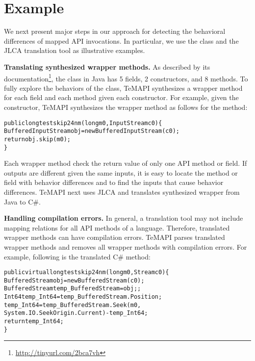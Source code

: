 \section{Example}
\label{sec:example}
We next present major steps in our approach for detecting the behavioral differences of mapped API invocations. In particular, we use the  class and the JLCA translation tool as illustrative examples.

\textbf{Translating synthesized wrapper methods.} As described by its documentation\footnote{\url{http://tinyurl.com/2bca7vh}}, the  class in Java has 5 fields, 2 constructors, and 8 methods. To fully explore the behaviors of the class, TeMAPI synthesizes a wrapper method for each field and each method given each constructor. For example, given the  constructor, TeMAPI synthesizes the wrapper method as follows for the  method:

\begin{CodeOut}\vspace*{-1ex}
\begin{alltt}
public long testskip24nm(long m0,InputStream c0)\{
  BufferedInputStream obj = new BufferedInputStream(c0);
  return obj.skip(m0);
\}  
\end{alltt}
\end{CodeOut}\vspace*{-2ex}

Each wrapper method check the return value of only one API method or field. If outputs are different given the same inputs, it is easy to locate the method or field with behavior differences and to find the inputs that cause behavior differences. TeMAPI next uses JLCA and translates synthesized wrapper from Java to C\#.

\textbf{Handling compilation errors.} In general, a translation tool may not include mapping relations for all API methods of a language. Therefore, translated wrapper methods can have compilation errors. TeMAPI parses translated wrapper methods and removes all wrapper methods with compilation errors. For example, following is the translated C\#  method:

\begin{CodeOut}\vspace*{-1ex}
\begin{alltt}
public virtual long testskip24nm(long m0, Stream c0)\{
  BufferedStream obj = new BufferedStream(c0);
  BufferedStream temp_BufferedStream = obj;;
  Int64 temp_Int64 = temp_BufferedStream.Position;
  temp_Int64 = temp_BufferedStream.Seek(m0, 
        System.IO.SeekOrigin.Current) - temp_Int64;
  return temp_Int64;
\}
\end{alltt}
\end{CodeOut}\vspace*{-2ex}

